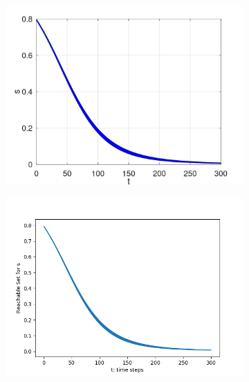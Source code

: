 \documentclass[EPiC]{easychair}
\begin{document}
\begin{figure}[h]
    \begin{subfigure}{0.47\textwidth}
    \centering
    \includegraphics[width=\textwidth]{SapoFigures/SIR/SapoSIR_S.jpg}
    \end{subfigure}
    \begin{subfigure}{0.47\textwidth}
    \centering
    \includegraphics[width=1.2\textwidth]{SapoFigures/SIR/KaaSIR_S.png}
    \end{subfigure}
 

\end{figure}
\end{document}
